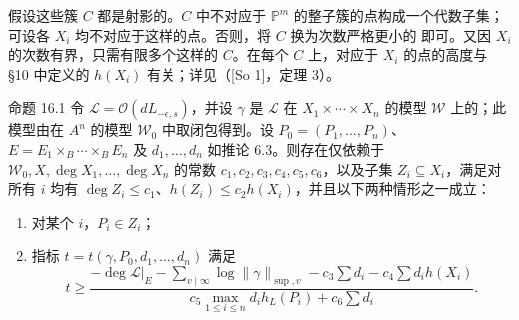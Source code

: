 假设这些簇 $C$ 都是射影的。$C$ 中不对应于 $\mathbb P^m$ 的整子簇的点构成一个代数子集；可设各 $X_i$ 均不对应于这样的点。否则，将 $C$ 换为次数严格更小的 即可。又因 $X_i$ 的次数有界，只需有限多个这样的 $C$。在每个 $C$ 上，对应于 $X_i$ 的点的高度与 §10 中定义的 $h(X_i)$ 有关；详见（[So 1]，定理 3）。
\begin{statement}{命题 16.1}
令 $\mathscr L=\mathcal O(dL_{-\epsilon,s})$，并设 $\gamma$ 是 $\mathscr L$ 在 $X_1\times\cdots\times X_n$ 的模型 $\mathscr W$ 上的；此模型由在 $A^n$ 的模型 $\mathscr W_0$ 中取闭包得到。设 $P_0=(P_1,\ldots,P_n)$、$E=E_1\times_B\cdots\times_BE_n$ 及 $d_1,\ldots,d_n$ 如推论 6.3。则存在仅依赖于 $\mathscr W_0,X,\deg X_1,\ldots,\deg X_n$ 的常数 $c_1,c_2,c_3,c_4,c_5,c_6$，以及子集 $Z_i\subseteq X_i$，满足对所有 $i$ 均有 $\deg Z_i\le c_1$、$h(Z_i)\le c_2h(X_i)$，并且以下两种情形之一成立：
\begin{enumerate}[label=(\alph*).]
\item 对某个 $i$，$P_i\in Z_i$；
\item 指标 $t=t(\gamma,P_0,d_1,\ldots,d_n)$ 满足
\[
t\ge\frac{-\deg\mathscr L|_E-\sum_{v\mid\infty}\log\|\gamma\|_{\sup,v}
-c_3\sum d_i-c_4\sum d_i h(X_i)}
{c_5\max_{1\le i\le n}d_i h_L(P_i)+c_6\sum d_i}.
\]
\end{enumerate}
\end{statement}
